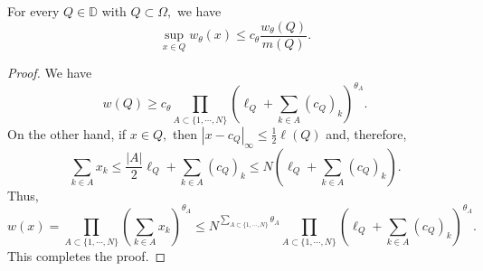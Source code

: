 \documentclass{amsart}
\begin{document}
\begin{lemma}\label{supremum vs average} For every $Q\in\mathbb{D}$ with $Q\subset\Omega,$ we have
$$\sup_{x\in Q}w_{\theta}(x)\leq c_{\theta}\frac{w_{\theta}(Q)}{m(Q)}.$$
\end{lemma}
\begin{proof} We have
$$w(Q)\geq c_{\theta}\prod_{A\subset\{1,\cdots,N\}}(\ell_Q+\sum_{k\in A}(c_Q)_k)^{\theta_A}.$$
On the other hand, if $x\in Q,$ then $|x-c_Q|_{\infty}\leq \frac12\ell(Q)$ and, therefore,
$$\sum_{k\in A}x_k\leq \frac{|A|}{2}\ell_Q+\sum_{k\in A}(c_Q)_k\leq N(\ell_Q+\sum_{k\in A}(c_Q)_k).$$
Thus,
$$w(x)=\prod_{A\subset\{1,\cdots,N\}}(\sum_{k\in A}x_k)^{\theta_A}\leq N^{\sum_{A\subset\{1,\cdots,N\}}\theta_A}\prod_{A\subset\{1,\cdots,N\}}(\ell_Q+\sum_{k\in A}(c_Q)_k)^{\theta_A}.$$
This completes the proof.
\end{proof}
\end{document}
